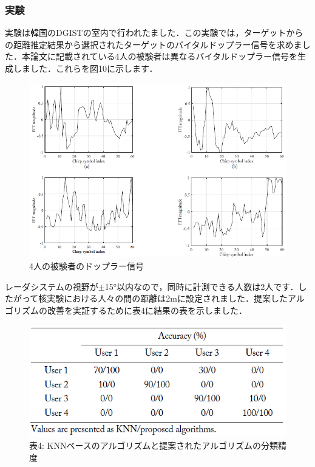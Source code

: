 \documentclass[dvipdfmx]{jsarticle}
\begin{document}
\subsubsection{実験}
実験は韓国のDGISTの室内で行われたました．この実験では，ターゲットからの距離推定結果から選択されたターゲットのバイタルドップラー信号を求めました．本論文に記載されている4人の被験者は異なるバイタルドップラー信号を生成しました．これらを図10に示します．

\begin{figure}[H]
\begin{center}
\includegraphics[width=\linewidth]{./img/doppler_signal.png}
\end{center}
\caption{4人の被験者のドップラー信号}
\end{figure}

レーダシステムの視野が$\pm$15°以内なので，同時に計測できる人数は2人です．したがって核実験における人々の間の距離は2mに設定されました．提案したアルゴリズムの改善を実証するために表4に結果の表を示しました．

\begin{figure}[H]
\caption*{表4: KNNベースのアルゴリズムと提案されたアルゴリズムの分類精度}
\begin{center}
\includegraphics[width=0.8\linewidth]{./img/knn_proposed.png}
\end{center}
\end{figure}
\end{document}
